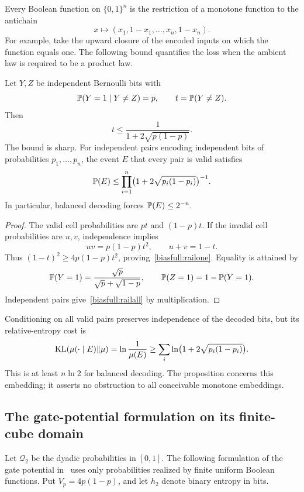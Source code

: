 Every Boolean function on \(\{0,1\}^n\) is the restriction of a
monotone function to the antichain
\[
 x\longmapsto(x_1,1-x_1,\ldots,x_n,1-x_n).
\]
For example, take the upward closure of the encoded inputs on
which the function equals one. The following bound quantifies the
loss when the ambient law is required to be a product law.

\begin{proposition}\label{biasfull:dualrail}
Let \(Y,Z\) be independent Bernoulli bits with
\[
 \P(Y=1\mid Y\ne Z)=p,\qquad t=\P(Y\ne Z).
\]
Then
\begin{equation}\label{biasfull:railone}
 t\le\frac1{1+2\sqrt{p(1-p)}}.
\end{equation}
The bound is sharp. For independent pairs encoding independent
bits of probabilities \(p_1,\ldots,p_n\), the event \(E\) that every
pair is valid satisfies
\begin{equation}\label{biasfull:railall}
 \P(E)\le\prod_{i=1}^n
       \bigl(1+2\sqrt{p_i(1-p_i)}\bigr)^{-1}.
\end{equation}
In particular, balanced decoding forces \(\P(E)\le2^{-n}\).
\end{proposition}
\begin{proof}
The valid cell probabilities are \(pt\) and \((1-p)t\).
If the invalid cell probabilities are \(u,v\), independence implies
\[
 uv=p(1-p)t^2,\qquad u+v=1-t.
\]
Thus \((1-t)^2\ge4p(1-p)t^2\), proving~\eqref{biasfull:railone}.
Equality is attained by
\[
 \P(Y=1)=\frac{\sqrt p}{\sqrt p+\sqrt{1-p}},
 \qquad \P(Z=1)=1-\P(Y=1).
\]
Independent pairs give~\eqref{biasfull:railall} by multiplication.
\end{proof}

Conditioning on all valid pairs preserves independence of the decoded
bits, but its relative-entropy cost is
\[
 \KL(\mu(\cdot\mid E)\|\mu)=\ln\frac1{\mu(E)}
 \ge\sum_i\ln\bigl(1+2\sqrt{p_i(1-p_i)}\bigr).
\]
This is at least \(n\ln2\) for balanced decoding. The proposition
concerns this embedding; it asserts no obstruction to all conceivable
monotone embeddings.

\subsection{The gate-potential formulation on its finite-cube domain}

Let \(\mathcal Q_2\) be the dyadic probabilities in \([0,1]\).
The following formulation of the gate potential in~\cite{BrainGate}
uses only probabilities realized by finite uniform Boolean functions.
Put \(V_p=4p(1-p)\), and let \(h_2\) denote binary entropy in bits.


